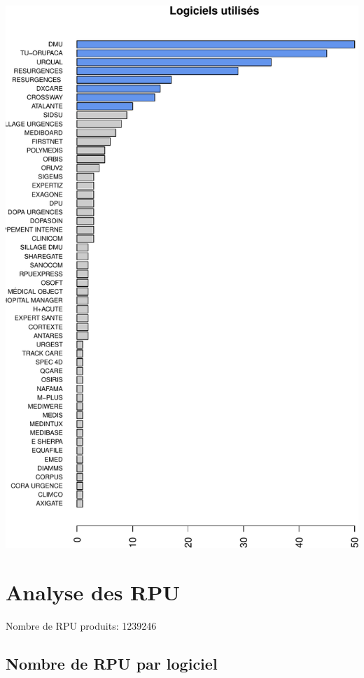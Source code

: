 \documentclass[]{article}
\begin{document}
\includegraphics{septembre2015_files/figure-latex/unnamed-chunk-7-1.pdf}

\section{Analyse des RPU}\label{analyse-des-rpu}

Nombre de RPU produits: 1239246

\subsection{Nombre de RPU par
logiciel}\label{nombre-de-rpu-par-logiciel}
\end{document}
